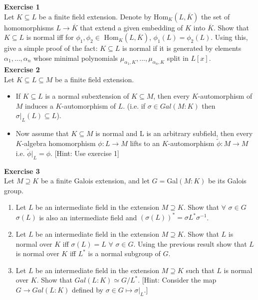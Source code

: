 \documentclass[12pt,a4paper]{article}
\begin{document}
 
\noindent

\textbf{Exercise 1}\\
Let $K\subseteq L$ be a finite field extension. Denote by Hom$_K(L, \overline{K})$ the set of homomorphisms $L\rightarrow \overline{K}$ that extend a given embedding of $K$ into $\overline{K}$. Show that $K\subseteq L$ is normal iff for $\phi_1,\phi_2\in$ Hom$_K(L, \overline{K})$, $\phi_1(L)=\phi_2(L)$. Using this, give a simple proof of the fact: $K\subseteq L$ is normal if it is generated by elements $\alpha_1,...,\alpha_n$ whose minimal polynomials $\mu_{\alpha_1,K},...,\mu_{\alpha_n,K}$ split in $L[x]$. \\


\textbf{Exercise 2}\\
Let $K\subseteq L\subseteq M$ be a finite field extension. 

\begin{itemize}
    \item If $K\subseteq L$ is a normal subextension of $K\subseteq M$, then every $K$-automorphism of $M$ induces a $K$-automorphism of $L$. (i.e. if $\sigma\in Gal(M:K)$ then $\sigma|_L(L)\subseteq L$).
    \item Now assume that $K\subseteq M$ is normal and L is an arbitrary subfield, then every $K$-algebra homomorphism $\phi:L\xrightarrow{}M$ lifts to an $K$-automorphism $\widetilde{\phi}:M\xrightarrow{}M$ i.e. $\widetilde{\phi}|_L=\phi$. [Hint: Use exercise 1]
\end{itemize}{}

\textbf{Exercise 3}\\
Let $M\supseteq K$ be a finite Galois extension, and let $G=$Gal$(M:K)$ be its Galois group. 
\begin{enumerate}
    \item Let $L$ be an intermediate field in the extension $M\supseteq K$. Show that $\forall$ $\sigma\in G$ $\sigma(L)$ is also an intermediate field and $(\sigma(L))^*=\sigma L^* \sigma^{-1}$.  
    \item Let $L$ be an intermediate field in the extension $M\supseteq K$. Show that $L$ is normal over $K$ iff $\sigma(L)=L$ $\forall$ $\sigma\in G$. Using the previous result show that $L$ is normal over $K$ iff $L^*$ is a normal subgroup of $G$.
    \item Let $L$ be an intermediate field in the extension $M\supseteq K$ such that $L$ is normal over $K$. Show that $Gal(L:K)\simeq G/L^*$.
    [Hint: Consider the map $G\xrightarrow{}Gal(L:K)$ defined by $\sigma\in G\mapsto \sigma|_{L}$.]
    
\end{enumerate}{}
\end{document}
